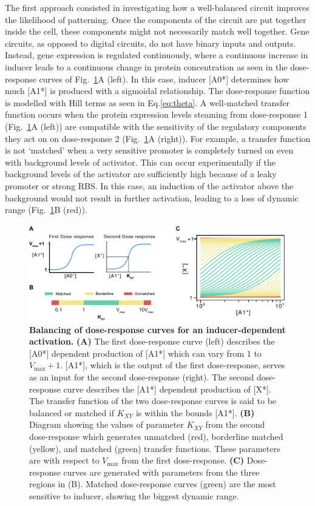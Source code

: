The first approach consisted in investigating how a well-balanced circuit improves the likelihood of patterning.
Once the components of the circuit are put together inside the cell,
these components might not necessarily match well together.
Gene circuits, as opposed to digital circuits, do not have binary inputs and outputs.
Instead, gene expression is regulated continuously,
where a continuous increase in inducer leads to a continuous change in protein concentration
as seen in the dose-response curves of Fig.~\ref{fig:balancing}A
(left).
In this case, inducer [A0*] determines how much [A1*] is produced with a sigmoidal relationship.
The dose-response function is modelled with Hill terms as seen in Eq.\ref{eq:theta}.
A well-matched transfer function occurs when the protein expression levels steaming from dose-response 1
(Fig.~\ref{fig:balancing}A (left))
are compatible with the sensitivity of the regulatory components they act on on dose-response 2
(Fig.~\ref{fig:balancing}A (right)).
For example, a transfer function is not ‘matched’
when a very sensitive promoter is completely turned on even with background levels of activator.
This can occur experimentally
if the background levels of the activator are sufficiently high because of a leaky promoter or strong RBS.
In this case, an induction of the activator above the background would not result in further activation,
leading to a loss of dynamic range (Fig.~\ref{fig:balancing}B (red)).


\begin{figure}[H]
    \centering
    \includegraphics[width=1\textwidth]{chapters/Chapter 2/balancing}
    \caption{\textbf{Balancing of dose-response curves for an inducer-dependent activation.} \textbf{(A)} The first dose-response curve (left) describes the [A0*] dependent production of [A1*] which can vary from $1$ to $V_{\max}+1 $. [A1*], which is the output of the first dose-response, serves as an input for the second dose-response (right). The second dose-response curve describes the [A1*] dependent production of [X*]. The transfer function of the two dose-response curves is said to be balanced or matched if $K_{XY}$ is within the bounds [A1*]. \textbf{(B)} Diagram showing the values of parameter $K_{XY}$ from the second dose-response which generates unmatched (red), borderline matched (yellow), and matched (green) transfer functions. These parameters are with respect to $V_{\max}$ from the first dose-response. \textbf{(C)} Dose-response curves are generated with parameters from the three regions in (B). Matched dose-response curves (green) are the most sensitive to inducer, showing the biggest dynamic range.}
    \label{fig:balancing}
\end{figure}


